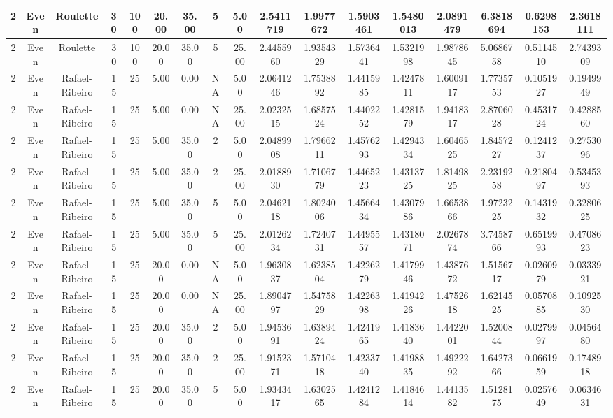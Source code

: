 \begin{longtable}{ | c | c | c | c | c | c | c | c | c | c | c | c | c | c | c | c | c | }
	\hline
	2	&	Even	&	Roulette	&	30	&	100	&	20.00	&	35.00	&	5	&	5.00	&	2.5411719	&	1.9977672	&	1.5903461	&	1.5480013	&	2.0891479	&	6.3818694	&	0.6298153	&	2.3618111 \\
	\hline
	2	&	Even	&	Roulette	&	30	&	100	&	20.00	&	35.00	&	5	&	25.00	&	2.4455960	&	1.9354329	&	1.5736441	&	1.5321998	&	1.9878645	&	5.0686758	&	0.5114510	&	2.7439309 \\
	\hline
	2	&	Even	&	Rafael-Ribeiro	&	15	&	25	&	5.00	&	0.00	&	NA	&	5.00	&	2.0641246	&	1.7538892	&	1.4415985	&	1.4247811	&	1.6009117	&	1.7735753	&	0.1051927	&	0.1949949 \\
	\hline
	2	&	Even	&	Rafael-Ribeiro	&	15	&	25	&	5.00	&	0.00	&	NA	&	25.00	&	2.0232515	&	1.6857524	&	1.4402252	&	1.4281579	&	1.9418317	&	2.8706028	&	0.4531724	&	0.4288560 \\
	\hline
	2	&	Even	&	Rafael-Ribeiro	&	15	&	25	&	5.00	&	35.00	&	2	&	5.00	&	2.0489908	&	1.7966211	&	1.4576293	&	1.4294334	&	1.6046525	&	1.8457227	&	0.1241237	&	0.2753096 \\
	\hline
	2	&	Even	&	Rafael-Ribeiro	&	15	&	25	&	5.00	&	35.00	&	2	&	25.00	&	2.0188930	&	1.7106779	&	1.4465223	&	1.4313725	&	1.8149825	&	2.2319258	&	0.2180497	&	0.5345393 \\
	\hline
	2	&	Even	&	Rafael-Ribeiro	&	15	&	25	&	5.00	&	35.00	&	5	&	5.00	&	2.0462118	&	1.8024006	&	1.4566434	&	1.4307986	&	1.6653866	&	1.9723225	&	0.1431932	&	0.3280625 \\
	\hline
	2	&	Even	&	Rafael-Ribeiro	&	15	&	25	&	5.00	&	35.00	&	5	&	25.00	&	2.0126234	&	1.7240731	&	1.4495557	&	1.4318071	&	2.0267874	&	3.7458766	&	0.6519993	&	0.4708623 \\
	\hline
	2	&	Even	&	Rafael-Ribeiro	&	15	&	25	&	20.00	&	0.00	&	NA	&	5.00	&	1.9630837	&	1.6238504	&	1.4226279	&	1.4179946	&	1.4387672	&	1.5156717	&	0.0260979	&	0.0333921 \\
	\hline
	2	&	Even	&	Rafael-Ribeiro	&	15	&	25	&	20.00	&	0.00	&	NA	&	25.00	&	1.8904797	&	1.5475829	&	1.4226398	&	1.4194226	&	1.4752618	&	1.6214525	&	0.0570885	&	0.1092530 \\
	\hline
	2	&	Even	&	Rafael-Ribeiro	&	15	&	25	&	20.00	&	35.00	&	2	&	5.00	&	1.9453691	&	1.6389424	&	1.4241965	&	1.4183640	&	1.4422001	&	1.5200844	&	0.0279997	&	0.0456480 \\
	\hline
	2	&	Even	&	Rafael-Ribeiro	&	15	&	25	&	20.00	&	35.00	&	2	&	25.00	&	1.9152371	&	1.5710418	&	1.4233740	&	1.4198835	&	1.4922292	&	1.6427366	&	0.0661959	&	0.1748918 \\
	\hline
	2	&	Even	&	Rafael-Ribeiro	&	15	&	25	&	20.00	&	35.00	&	5	&	5.00	&	1.9343417	&	1.6302565	&	1.4241284	&	1.4184614	&	1.4413582	&	1.5128175	&	0.0257649	&	0.0634631 \\

\end{longtable}
